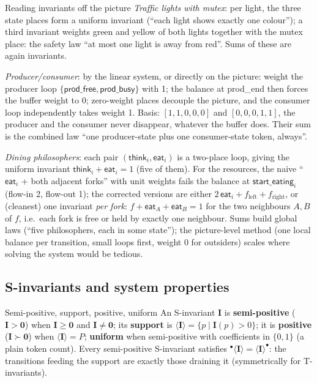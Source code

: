 \begin{examplebox}{Reading invariants off the picture}
\emph{Traffic lights with mutex}: per light, the three state places form a uniform invariant (``each light shows exactly one colour''); a third invariant weights green and yellow of both lights together with the mutex place: the safety law ``at most one light is away from red''. Sums of these are again invariants.
\par\smallskip
\emph{Producer/consumer}: by the linear system, or directly on the picture: weight the producer loop $\{\textsf{prod\_free}, \textsf{prod\_busy}\}$ with 1; the balance at \textsf{prod\_end} then forces the buffer weight to 0; zero-weight places decouple the picture, and the consumer loop independently takes weight 1. Basis: $[1,1,0,0,0]$ and $[0,0,0,1,1]$, the producer and the consumer never disappear, whatever the buffer does. Their sum is the combined law ``one producer-state plus one consumer-state token, always''.
\par\smallskip
\emph{Dining philosophers}: each pair $(\textsf{think}_i, \textsf{eat}_i)$ is a two-place loop, giving the uniform invariant $\textsf{think}_i + \textsf{eat}_i = 1$ (five of them). For the resources, the naive ``$\textsf{eat}_i$ + both adjacent forks'' with unit weights fails the balance at $\textsf{start\_eating}_i$ (flow-in 2, flow-out 1); the corrected versions are either $2\,\textsf{eat}_i + f_{\text{left}} + f_{\text{right}}$, or (cleanest) one invariant \emph{per fork}: $f + \textsf{eat}_A + \textsf{eat}_B = 1$ for the two neighbours $A, B$ of $f$, i.e.\ each fork is free or held by exactly one neighbour. Sums build global laws (``five philosophers, each in some state''); the picture-level method (one local balance per transition, small loops first, weight 0 for outsiders) scales where solving the system would be tedious.
\end{examplebox}

\subsection{S-invariants and system properties}

\begin{definitionbox}{Semi-positive, support, positive, uniform}
An S-invariant $\mathbf{I}$ is \textbf{semi-positive} ($\mathbf{I} > \mathbf{0}$) when $\mathbf{I} \geq \mathbf{0}$ and $\mathbf{I} \neq \mathbf{0}$; its \textbf{support} is $\langle \mathbf{I} \rangle = \{p \mid \mathbf{I}(p) > 0\}$; it is \textbf{positive} ($\mathbf{I} \succ \mathbf{0}$) when $\langle \mathbf{I} \rangle = P$; \textbf{uniform} when semi-positive with coefficients in $\{0, 1\}$ (a plain token count). Every semi-positive S-invariant satisfies ${}^\bullet\langle \mathbf{I} \rangle = \langle \mathbf{I} \rangle^\bullet$: the transitions feeding the support are exactly those draining it (symmetrically for T-invariants).
\end{definitionbox}

